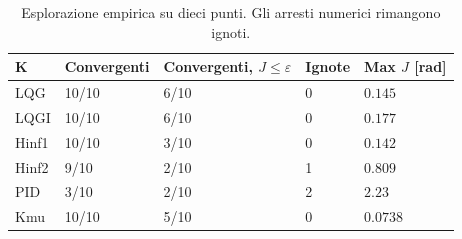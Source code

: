 \begin{table}[htbp]\centering\small
\begin{tabular}{lllll}\toprule
K & Convergenti & Convergenti, $J\le\varepsilon$ & Ignote & Max $J$ [rad]\\\midrule
LQG & 10/10 & 6/10 & 0 & $0.145$\\
LQGI & 10/10 & 6/10 & 0 & $0.177$\\
Hinf1 & 10/10 & 3/10 & 0 & $0.142$\\
Hinf2 & 9/10 & 2/10 & 1 & $0.809$\\
PID & 3/10 & 2/10 & 2 & $2.23$\\
Kmu & 10/10 & 5/10 & 0 & $0.0738$\\
\bottomrule\end{tabular}
\caption{Esplorazione empirica su dieci punti. Gli arresti numerici rimangono ignoti.}
\end{table}
